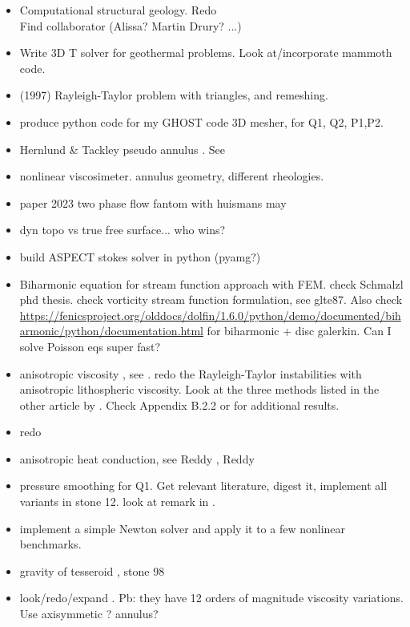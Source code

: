 \documentclass[a4paper]{article}
\begin{document}
\begin{itemize}
\item Computational structural geology. Redo  \\
Find collaborator (Alissa? Martin Drury? ...)
\item Write 3D T solver for geothermal problems. Look at/incorporate
mammoth code.
\item \textcite{vaks97} (1997) Rayleigh-Taylor problem with triangles, and remeshing.
\item produce python code for my GHOST code \textcite{thie18} 3D mesher, for Q1, Q2, P1,P2.
\item Hernlund \& Tackley pseudo annulus . See \textcite{josv21}
\item nonlinear viscosimeter. annulus geometry, different rheologies.
\item paper 2023 two phase flow fantom with huismans may
\item dyn topo vs true free surface... who wins?
\item build ASPECT stokes solver in python (pyamg?)
\item Biharmonic equation for stream function approach with FEM. check Schmalzl phd thesis.
check vorticity stream function formulation, see glte87.
Also check \url{https://fenicsproject.org/olddocs/dolfin/1.6.0/python/demo/documented/biharmonic/python/documentation.html} for biharmonic + disc galerkin. Can I solve Poisson eqs super fast?
\item anisotropic viscosity , see \textcite{leha08}.
redo the Rayleigh-Taylor instabilities with 
anisotropic lithospheric viscosity.
Look at the three methods listed in the other article by \textcite{leha08b}. 
Check Appendix B.2.2 or \textcite{perr19} for additional results.

\item redo 
\item anisotropic heat conduction, see  Reddy \cite[p121]{reddybook2}, Reddy \cite[p143]{reddybook2} 
\item pressure smoothing for Q1. Get relevant literature, digest it, implement all variants in stone 12.
look at remark in \textcite{lumh24}.

\item implement a simple Newton solver and apply it to a few nonlinear  benchmarks. 

\item gravity of tesseroid , stone 98
\item look/redo/expand . Pb: they have 12 orders of magnitude viscosity variations.
Use axisymmetic ? annulus?


\end{itemize}
\end{document}

